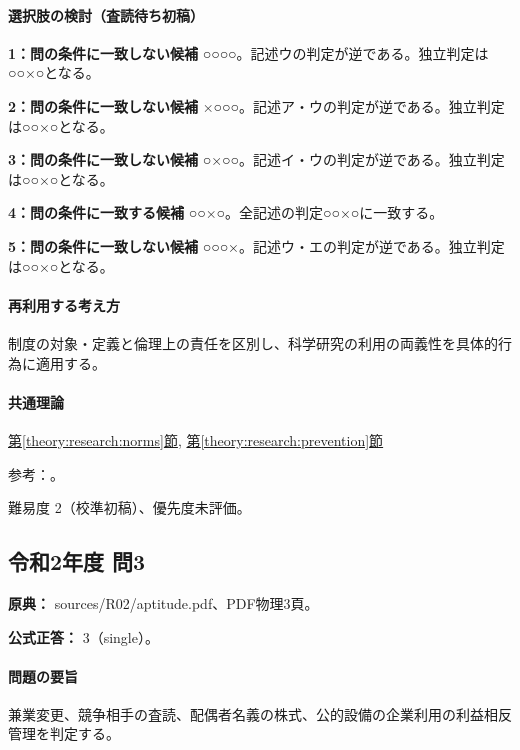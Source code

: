 \paragraph{選択肢の検討（査読待ち初稿）}\mbox{}\par

\noindent\textbf{1：問の条件に一致しない候補} ○○○○。記述ウの判定が逆である。独立判定は○○×○となる。\par

\noindent\textbf{2：問の条件に一致しない候補} ×○○○。記述ア・ウの判定が逆である。独立判定は○○×○となる。\par

\noindent\textbf{3：問の条件に一致しない候補} ○×○○。記述イ・ウの判定が逆である。独立判定は○○×○となる。\par

\noindent\textbf{4：問の条件に一致する候補} ○○×○。全記述の判定○○×○に一致する。\par

\noindent\textbf{5：問の条件に一致しない候補} ○○○×。記述ウ・エの判定が逆である。独立判定は○○×○となる。\par

\paragraph{再利用する考え方} 制度の対象・定義と倫理上の責任を区別し、科学研究の利用の両義性を具体的行為に適用する。

\paragraph{共通理論} \hyperref[theory:research:norms]{第\ref*{theory:research:norms}節}, \hyperref[theory:research:prevention]{第\ref*{theory:research:prevention}節}

\par 参考：\cite{scj_code2013}。

\par 難易度 2（校準初稿）、優先度未評価。

\subsection{令和2年度 問3}
\label{q:r02-reg-apt-03}

\noindent\textbf{原典：} sources/R02/aptitude.pdf、PDF物理3頁。

\textbf{公式正答：} 3（single）。

\paragraph{問題の要旨} 兼業変更、競争相手の査読、配偶者名義の株式、公的設備の企業利用の利益相反管理を判定する。

